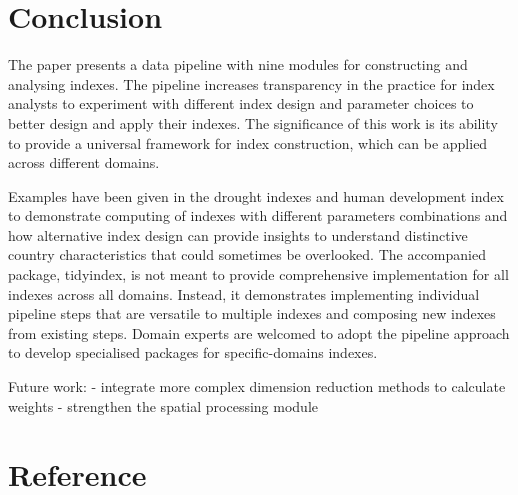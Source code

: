 \documentclass[
]{interact}
\begin{document}
\hypertarget{conclusion}{%
\section{Conclusion}\label{conclusion}}

The paper presents a data pipeline with nine modules for constructing
and analysing indexes. The pipeline increases transparency in the
practice for index analysts to experiment with different index design
and parameter choices to better design and apply their indexes. The
significance of this work is its ability to provide a universal
framework for index construction, which can be applied across different
domains.

Examples have been given in the drought indexes and human development
index to demonstrate computing of indexes with different parameters
combinations and how alternative index design can provide insights to
understand distinctive country characteristics that could sometimes be
overlooked. The accompanied package, tidyindex, is not meant to provide
comprehensive implementation for all indexes across all domains.
Instead, it demonstrates implementing individual pipeline steps that are
versatile to multiple indexes and composing new indexes from existing
steps. Domain experts are welcomed to adopt the pipeline approach to
develop specialised packages for specific-domains indexes.

Future work: - integrate more complex dimension reduction methods to
calculate weights - strengthen the spatial processing module

\hypertarget{reference}{%
\section*{Reference}\label{reference}}
\end{document}
